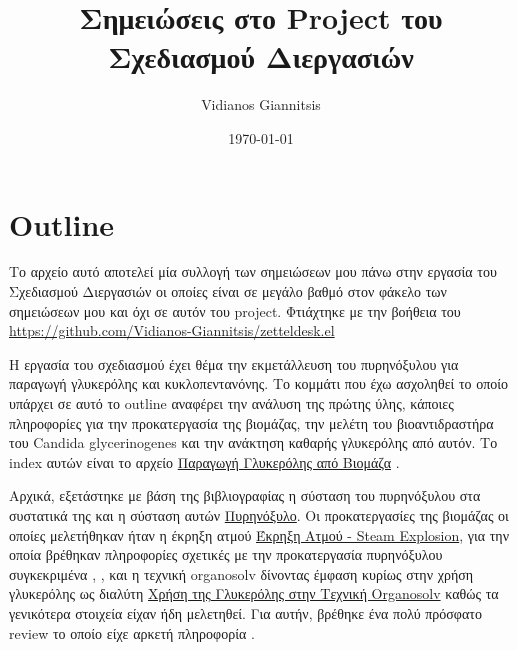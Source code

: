 \documentclass[11pt]{article}
\author{Vidianos Giannitsis}
\date{\today}
\title{Σημειώσεις στο Project του Σχεδιασμού Διεργασιών}
\begin{document}
\maketitle
\tableofcontents


\section{Outline}
\label{sec:orgd96e933}
Το αρχείο αυτό αποτελεί μία συλλογή των σημειώσεων μου πάνω στην εργασία του Σχεδιασμού Διεργασιών οι οποίες είναι σε μεγάλο βαθμό στον φάκελο των σημειώσεων μου και όχι σε αυτόν του project. Φτιάχτηκε με την βοήθεια του \url{https://github.com/Vidianos-Giannitsis/zetteldesk.el}

Η εργασία του σχεδιασμού έχει θέμα την εκμετάλλευση του πυρηνόξυλου για παραγωγή γλυκερόλης και κυκλοπεντανόνης. Το κομμάτι που έχω ασχοληθεί το οποίο υπάρχει σε αυτό το outline αναφέρει την ανάλυση της πρώτης ύλης, κάποιες πληροφορίες για την προκατεργασία της βιομάζας, την μελέτη του βιοαντιδραστήρα του Candida glycerinogenes και την ανάκτηση καθαρής γλυκερόλης από αυτόν. Το index αυτών είναι το αρχείο \href{\detokenize{../../../../org_roam/παραγωγη_γλυκερολης_απο_βιομαζα-13-10-22.org}}{Παραγωγή Γλυκερόλης από Βιομάζα} .

Αρχικά, εξετάστηκε με βάση της βιβλιογραφίας η σύσταση του πυρηνόξυλου στα συστατικά της και η σύσταση αυτών \href{\detokenize{../../../../org_roam/πυρηνοξυλο-08-11-22.org}}{Πυρηνόξυλο}. Οι προκατεργασίες της βιομάζας οι οποίες μελετήθηκαν ήταν η έκρηξη ατμού \href{\detokenize{../../../../org_roam/εκρηξη_ατμου_steam_explosion_μια_αποτελεσματικη_τεχνικη_διαχωρισμου_της_βιομαζας-08-11-22.org}}{Έκρηξη Ατμού - Steam Explosion}, για την οποία βρέθηκαν πληροφορίες σχετικές με την προκατεργασία πυρηνόξυλου συγκεκριμένα \cite{fernandez-bolanosSteamexplosionOliveStones2001} ,\cite{rodriguezOliveStoneAttractive2008}  , \cite{fernandez-bolanosCharacterizationLigninObtained1999} και η τεχνική organosolv δίνοντας έμφαση κυρίως στην χρήση γλυκερόλης ως διαλύτη \href{\detokenize{../../../../org_roam/χρηση_της_γλυκερολης_στην_τεχνικη_organosolv-09-11-22.org}}{Χρήση της Γλυκερόλης στην Τεχνική Organosolv} καθώς τα γενικότερα στοιχεία είχαν ήδη μελετηθεί. Για αυτήν, βρέθηκε ένα πολύ πρόσφατο review το οποίο είχε αρκετή πληροφορία \cite{sunGlycerolOrganosolvPretreatment2022} .
\end{document}
